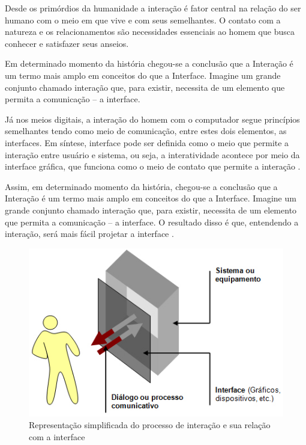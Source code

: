 Desde os primórdios da humanidade a interação é fator central na relação do ser humano com o meio em que vive e com seus semelhantes. O contato com a natureza e os relacionamentos são necessidades essenciais ao homem que busca conhecer e satisfazer seus anseios. 

Em determinado momento da história chegou-se a conclusão que a Interação é um termo mais amplo em conceitos do que a Interface. Imagine um grande conjunto chamado interação que, para existir, necessita de um elemento que permita a comunicação – a interface.  

Já nos meios digitais, a interação do homem com o computador segue princípios semelhantes tendo como meio de comunicação, entre estes dois elementos, as interfaces. Em síntese, interface pode ser definida como o meio que permite a interação entre usuário e sistema, ou seja, a interatividade acontece por meio da interface gráfica, que funciona como o meio de contato que permite a interação \cite{lemos2015cibercultura}. 

Assim, em determinado momento da história, chegou-se a conclusão que a Interação é um termo mais amplo em conceitos do que a Interface. Imagine um grande conjunto chamado interação que, para existir, necessita de um elemento que permita a comunicação – a interface. O resultado disso é que, entendendo a interação, será mais fácil projetar a interface \cite{IrlaRebelo}.

\begin{figure}[H]
    \centering
    \includegraphics[scale=0.6]{imagens/interfaceinteracao.jpg}
    \caption{Representação simplificada do processo de interação e sua relação com a interface}
    \label{fig:interface-interacao}
\end{figure}

